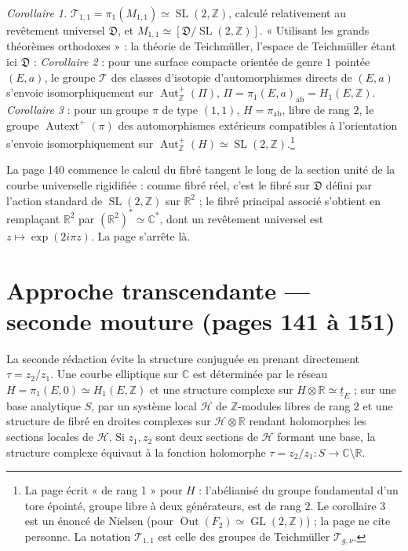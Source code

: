 \documentclass[11pt,a4paper]{article}
\begin{document}
\emph{Corollaire 1.} $\mathcal{T}_{1,1} = \pi_1(M_{1,1}) \simeq
\operatorname{SL}(2, \mathbb{Z})$, calculé relativement au revêtement universel
$\mathfrak{D}$, et $M_{1,1} \simeq [\mathfrak{D} / \operatorname{SL}(2,
\mathbb{Z})]$. « Utilisant les grands théorèmes orthodoxes » : la théorie de
Teichmüller, l'espace de Teichmüller étant ici $\mathfrak{D}$ :
\emph{Corollaire 2} : pour une surface compacte orientée de genre $1$ pointée
$(E, a)$, le groupe $\mathcal{T}$ des classes d'isotopie d'automorphismes
directs de $(E, a)$ s'envoie isomorphiquement sur
$\operatorname{Aut}^{+}_{\mathbb{Z}}(\Pi)$, $\Pi = \pi_1(E, a)_{\mathrm{ab}} =
H_1(E, \mathbb{Z})$. \emph{Corollaire 3} : pour un groupe $\pi$ de type
$(1, 1)$, $H = \pi_{\mathrm{ab}}$, libre de rang $2$, le groupe
$\operatorname{Autext}^{+}(\pi)$ des automorphismes extérieurs compatibles à
l'orientation s'envoie isomorphiquement sur $\operatorname{Aut}^{+}_{\mathbb{Z}}(H)
\simeq \operatorname{SL}(2, \mathbb{Z})$.\footnote{La page écrit « de rang 1 »
pour $H$ : l'abélianisé du groupe fondamental d'un tore épointé, groupe libre à
deux générateurs, est de rang $2$. Le corollaire 3 est un énoncé de Nielsen
(pour $\operatorname{Out}(F_2) \simeq \operatorname{GL}(2, \mathbb{Z})$) ; la
page ne cite personne. La notation $\mathcal{T}_{1,1}$ est celle des groupes de
Teichmüller $\mathcal{T}_{g,\nu}$.}

La page 140 commence le calcul du fibré tangent le long de la section unité de
la courbe universelle rigidifiée : comme fibré réel, c'est le fibré sur
$\mathfrak{D}$ défini par l'action standard de $\operatorname{SL}(2, \mathbb{Z})$
sur $\mathbb{R}^2$ ; le fibré principal associé s'obtient en remplaçant
$\mathbb{R}^2$ par $(\mathbb{R}^2)^{*} \simeq \mathbb{C}^{*}$, dont un revêtement
universel est $z \mapsto \exp(2i\pi z)$. La page s'arrête là.

\section*{Approche transcendante --- seconde mouture (pages 141 à 151)}

La seconde rédaction évite la structure conjuguée en prenant directement $\tau =
z_2/z_1$. Une courbe elliptique sur $\mathbb{C}$ est déterminée par le réseau $H
= \pi_1(E, 0) \simeq H_1(E, \mathbb{Z})$ et une structure complexe sur $H
\otimes \mathbb{R} \simeq \underline{t}_E$ ; sur une base analytique $S$, par un
système local $\mathcal{H}$ de $\mathbb{Z}$-modules libres de rang $2$ et une
structure de fibré en droites complexes sur $\mathcal{H} \otimes \mathbb{R}$
rendant holomorphes les sections locales de $\mathcal{H}$. Si $z_1, z_2$ sont deux
sections de $\mathcal{H}$ formant une base, la structure complexe équivaut à la
fonction holomorphe $\tau = z_2/z_1 : S \to \mathbb{C} \setminus \mathbb{R}$.
\end{document}
